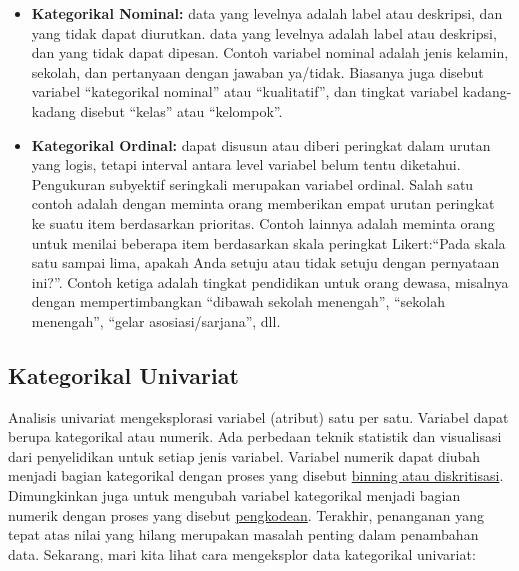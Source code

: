 \documentclass[
]{book}
\begin{document}
\begin{itemize}
\item
  \textbf{Kategorikal Nominal:} data yang levelnya adalah label atau deskripsi, dan yang tidak dapat diurutkan.
  data yang levelnya adalah label atau deskripsi, dan yang tidak dapat dipesan. Contoh variabel nominal adalah jenis kelamin, sekolah, dan pertanyaan dengan jawaban ya/tidak. Biasanya juga disebut variabel ``kategorikal nominal'' atau ``kualitatif'', dan tingkat variabel kadang-kadang disebut ``kelas'' atau ``kelompok''.
\item
  \textbf{Kategorikal Ordinal:} dapat disusun atau diberi peringkat dalam urutan yang logis, tetapi interval antara level variabel belum tentu diketahui. Pengukuran subyektif seringkali merupakan variabel ordinal. Salah satu contoh adalah dengan meminta orang memberikan empat urutan peringkat ke suatu item berdasarkan prioritas. Contoh lainnya adalah meminta orang untuk menilai beberapa item berdasarkan skala peringkat Likert:``Pada skala satu sampai lima, apakah Anda setuju atau tidak setuju dengan pernyataan ini?''. Contoh ketiga adalah tingkat pendidikan untuk orang dewasa, misalnya dengan mempertimbangkan ``dibawah sekolah menengah'', ``sekolah menengah'', ``gelar asosiasi/sarjana'', dll.
\end{itemize}

\hypertarget{kategorikal-univariat}{%
\subsection{Kategorikal Univariat}\label{kategorikal-univariat}}

Analisis univariat mengeksplorasi variabel (atribut) satu per satu. Variabel dapat berupa kategorikal atau numerik. Ada perbedaan teknik statistik dan visualisasi dari penyelidikan untuk setiap jenis variabel. Variabel numerik dapat diubah menjadi bagian kategorikal dengan proses yang disebut \href{https://www.saedsayad.com/binning.htm}{binning atau diskritisasi}. Dimungkinkan juga untuk mengubah variabel kategorikal menjadi bagian numerik dengan proses yang disebut \href{https://www.saedsayad.com/encoding.htm}{pengkodean}. Terakhir, penanganan yang tepat atas nilai yang hilang merupakan masalah penting dalam penambahan data. Sekarang, mari kita lihat cara mengeksplor data kategorikal univariat:
\end{document}

